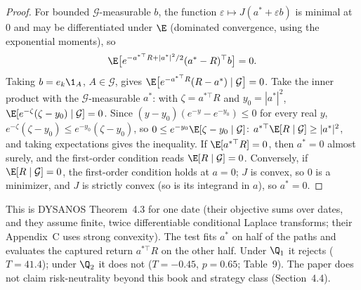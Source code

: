 \begin{proof}
For bounded $\mathcal G$-measurable $b$, the function $\varepsilon\mapsto J(a^*+\varepsilon b)$ is minimal at $0$ and may be differentiated
under $\E$ (dominated convergence, using the exponential moments), so
\[
  \E\big[e^{-a^{*\top}R+|a^*|^2/2}(a^*-R)^\top b\big]=0 .
\]
Taking $b=e_k\1_A$, $A\in\mathcal G$, gives $\E\big[e^{-a^{*\top}R}(R-a^*)\mid\mathcal G\big]=0$. Take the inner product with the $\mathcal G$-measurable $a^*$:
with $\zeta=a^{*\top}R$ and $y_0=|a^*|^2$, $\E[e^{-\zeta}(\zeta-y_0)\mid\mathcal G]=0$. Since $(y-y_0)(e^{-y}-e^{-y_0})\le0$ for every real $y$,
$e^{-\zeta}(\zeta-y_0)\le e^{-y_0}(\zeta-y_0)$, so $0\le e^{-y_0}\E[\zeta-y_0\mid\mathcal G]$: $a^{*\top}\E[R\mid\mathcal G]\ge|a^*|^2$, and taking expectations
gives the inequality. If $\E[a^{*\top}R]=0$, then $a^*=0$ almost surely, and the first-order condition reads $\E[R\mid\mathcal G]=0$.
Conversely, if $\E[R\mid\mathcal G]=0$, the first-order condition holds at $a=0$; $J$ is convex, so $0$ is a minimizer, and $J$ is strictly convex (so is its integrand in $a$), so $a^*=0$.
\end{proof}

This is DYSANOS Theorem~4.3 for one date (their objective sums over dates, and they assume finite, twice differentiable conditional
Laplace transforms; their Appendix~C uses strong convexity). The test fits $a^*$ on half of the paths and evaluates the captured return
$a^{*\top}R$ on the other half. Under $\Q_1$ it rejects ($T=41.4$); under $\Q_2$ it does not ($T=-0.45$, $p=0.65$; Table~9). The paper does not
claim risk-neutrality beyond this book and strategy class (Section~4.4).


